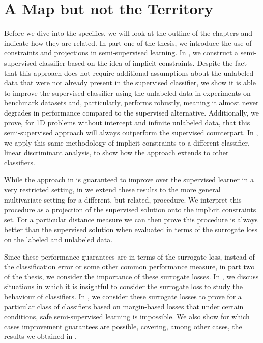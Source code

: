 \documentclass[twoside]{memoir}\usepackage[]{graphicx}\usepackage{xcolor}
\begin{document}
\section{A Map but not the Territory}
Before we dive into the specifics, we will look at the outline of the chapters and indicate how they are related. In part one of the thesis, we introduce the use of constraints and projections in semi-supervised learning. In , we construct a semi-supervised classifier based on the idea of implicit constraints. Despite the fact that this approach does not require additional assumptions about the unlabeled data that were not already present in the supervised classifier, we show it is able to improve the supervised classifier using the unlabeled data in experiments on benchmark datasets and, particularly, performs robustly, meaning it almost never degrades in performance compared to the supervised alternative. Additionally, we prove, for 1D problems without intercept and infinite unlabeled data, that this semi-supervised approach will always outperform the supervised counterpart. In , we apply this same methodology of implicit constraints to a different classifier, linear discriminant analysis, to show how the approach extends to other classifiers. 

While the approach in  is guaranteed to improve over the supervised learner in a very restricted setting, in  we extend these results to the more general multivariate setting for a different, but related, procedure. We interpret this procedure as a projection of the supervised solution onto the implicit constraints set. For a particular distance measure we can then prove this procedure is always better than the supervised solution when evaluated in terms of the surrogate loss on the labeled and unlabeled data. 

Since these performance guarantees are in terms of the surrogate loss, instead of the classification error or some other common performance measure, in part two of the thesis, we consider the importance of these surrogate losses. In , we discuss situations in which it is insightful to consider the surrogate loss to study the behaviour of classifiers.
In , we consider these surrogate losses to prove for a particular class of classifiers based on margin-based losses that under certain conditions, safe semi-supervised learning is impossible. We also show for which cases improvement guarantees are possible, covering, among other cases, the results we obtained in .
\end{document}
